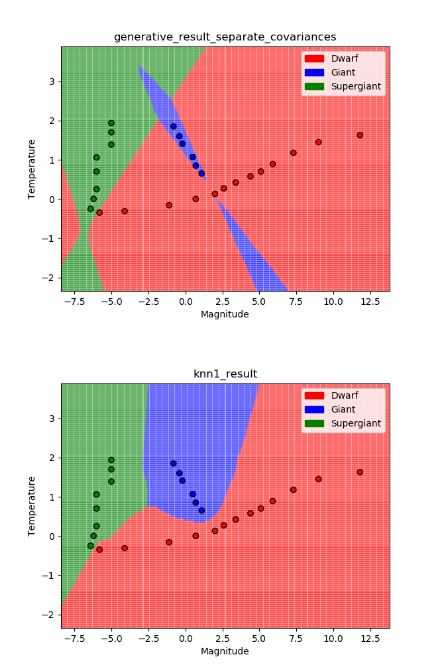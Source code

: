 \documentclass[submit]{harvardml}
\begin{document}
\begin{enumerate}
    \begin{figure} [h!]
        \centering
        \includegraphics[height=0.4\textheight]{HW2/generative_result_separate_covariances.png}
    \end{figure}
    \begin{figure} [h!]
        \centering
        \includegraphics[height=0.4\textheight]{HW2/knn1_result.png}
    \end{figure}
    \begin{figure} [h!]
        \centering

\end{figure}
\end{enumerate}
\end{document}
